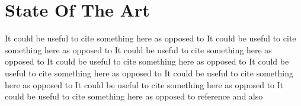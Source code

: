 
\section{State Of The Art}
\label{chpLitReview-secStateOfTheArt}

It could be useful to cite something here as opposed to
It could be useful to cite something here as opposed to
It could be useful to cite something here as opposed to
It could be useful to cite something here as opposed to
It could be useful to cite something here as opposed to
It could be useful to cite something here as opposed to
It could be useful to cite something here as opposed to
It could be useful to cite something here as opposed to
reference\cite{JackKurzweil2000}
and also\cite{315590}


